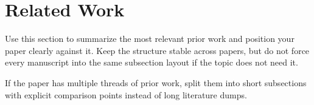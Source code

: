 \section{Related Work}

Use this section to summarize the most relevant prior work and position your paper clearly against it. Keep the structure stable across papers, but do not force every manuscript into the same subsection layout if the topic does not need it.

If the paper has multiple threads of prior work, split them into short subsections with explicit comparison points instead of long literature dumps.
